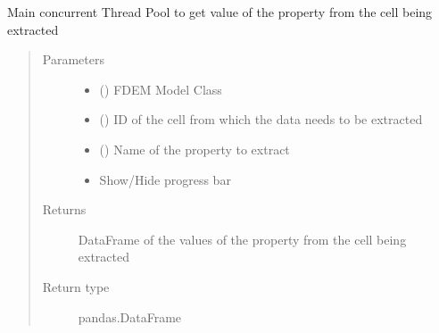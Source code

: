 \documentclass[letterpaper,10pt,english]{sphinxmanual}
\begin{document}

\begin{fulllineitems}
\label{\detokenize{openfdem:openfdem.extract_cell_thread_pool_generators.main}}
Main concurrent Thread Pool to get value of the property from the cell being extracted
\begin{quote}\begin{description}
\item[{Parameters}] \leavevmode\begin{itemize}
\item {} 
 ({\hyperref[\detokenize{openfdem:openfdem.openfdem.Model}]{}}) \textendash{} FDEM Model Class

\item {} 
 () \textendash{} ID of the cell from which the data needs to be extracted

\item {} 
 (\sphinxstyleliteralemphasis{\sphinxupquote{{[}}}\sphinxstyleliteralemphasis{\sphinxupquote{{]}}}) \textendash{} Name of the property to extract

\item {} 
 \textendash{} Show/Hide progress bar

\end{itemize}

\item[{Returns}] \leavevmode
DataFrame of the values of the property from the cell being extracted

\item[{Return type}] \leavevmode
pandas.DataFrame

\end{description}\end{quote}

\end{fulllineitems}
\end{document}
